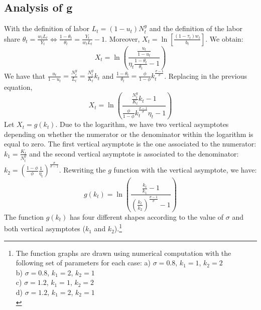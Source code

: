 
\newpage
\subsection{Analysis of g} %

With the definition of labor $L_t = (1-u_t)N^y_t$ and the definition of the labor share $\theta_t = \frac{w_t L_t}{Y_t} \Leftrightarrow \frac{1-\theta_t}{\theta_t} = \frac{Y_t}{w_t L_t} - 1$. Moreover, $X_t = \ln\left[\frac{(1-\tau_t)w_t}{b_t}\right]$. We obtain:
\begin{equation*}
X_t = \ln\left(\frac{\frac{u_t}{1-u_t}}{\eta_t\frac{1-\theta_t}{\theta_t}-1}\right)
\end{equation*}
We have that $\frac{u_t}{1-u_t} = \frac{N_t^y}{L_t} = \frac{N_t^y}{K_t}k_t$ and $\frac{1-\theta_t}{\theta_t} = \frac{\phi}{1-\phi}k_t^{\frac{\sigma-1}{\sigma}}$. Replacing in the previous equation,
\begin{equation*}
X_t = \ln \left( \frac{\frac{N_t^y}{K_t}k_t -1}{\frac{\phi}{1-\phi}k_t^{\frac{\sigma-1}{\sigma}}\eta_t -1} \right)
\end{equation*}
Let $X_t = g(k_t)$. Due to the logarithm, we have two vertical asymptotes depending on whether the numerator or the denominator within the logarithm is equal to zero. The first vertical asymptote is the one associated to the numerator: $k_1 = \frac{K_t}{N_t^y}$ and the second vertical asymptote is associated to the denominator: $k_2 = \left(\frac{1-\phi}{\phi} \frac{1}{\eta_t}\right)^{\frac{\sigma}{\sigma-1}}$. Rewriting the $g$ function with the vertical asymptote, we have:
\begin{equation*}
g(k_t) = \ln\left( \frac{\frac{k_t}{k_1}-1}{\left(\frac{k_t}{k_2}\right)^{\frac{\sigma - 1}{\sigma}} - 1} \right)
\end{equation*}
The function $g(k_t)$ has four different shapes according to the value of $\sigma$ and both vertical asymptotes ($k_1$ and $k_2$).\footnote{The function graphs are drawn using numerical computation with the following set of parameters for each case: a) $\sigma = 0.8$, $k_1 = 1$, $k_2 = 2$\\ b) $\sigma = 0.8$, $k_1 = 2$, $k_2 = 1$\\ c) $\sigma = 1.2$, $k_1 = 1$, $k_2 = 2$\\ d) $\sigma = 1.2$, $k_1 = 2$, $k_2 = 1$\\}


